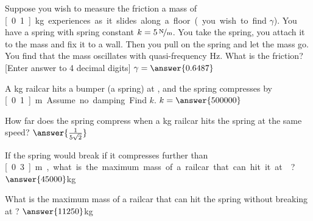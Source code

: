 \documentclass{ximera}
\begin{document}
\begin{exercise}
    Suppose you wish to measure the friction a mass of \unit[0.1]{kg} experiences as it slides along a floor (you wish to find $\gamma$).  You have a spring with spring constant $k=\unitfrac[5]{N}{m}$.  You take the spring, you attach it to the mass and fix it to a wall.  Then you pull on the spring and let the mass go.  You find that the mass oscillates with quasi-frequency \unit[1]{Hz}. What is the friction? [Enter answer to 4 decimal digits] $\gamma = \answer{0.6487}$
\end{exercise}

\begin{exercise}%
    A \unit[5000]{kg} railcar hits a bumper (a spring) at , and the spring compresses by \unit[0.1]{m}.  Assume no damping.
    
    Find $k$. $k=\answer{500000}$
    \begin{problem}
        How far does the spring compress when a \unit[10000]{kg} railcar hits the spring at the same speed? $\answer{\frac{1}{5\sqrt{2}}}$
        \begin{problem}
            If the spring would break if it compresses further than \unit[0.3]{m}, what is the maximum mass of a railcar that can hit it at ? $\answer{45000}$kg
            \begin{problem}
                What is the maximum mass of a railcar that can hit the spring without breaking at ? $\answer{11250}$kg
            \end{problem}
        \end{problem}
    \end{problem}
\end{exercise}
\end{document}

